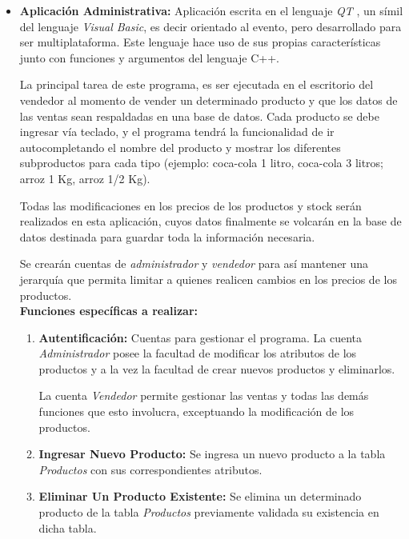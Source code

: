 \documentclass[a4paper,12pt]{article}
\begin{document}
  \begin{itemize}
   \item \textbf{Aplicación Administrativa:} 
    Aplicación escrita en el lenguaje \emph{QT} \cite{qtweb}, un símil del lenguaje
    \emph{Visual Basic}, es decir orientado al evento, pero desarrollado para ser multiplataforma. 
    Este lenguaje hace uso de sus propias características junto con funciones y argumentos del lenguaje C++.

    La principal tarea de este programa, es ser ejecutada en el escritorio del vendedor al momento de vender un
    determinado producto y que los datos de las ventas sean respaldadas en una base de datos. Cada producto se debe
    ingresar vía teclado, y el programa tendrá la funcionalidad de ir autocompletando el nombre del producto y mostrar
    los diferentes subproductos para cada tipo (ejemplo: coca-cola 1 litro, coca-cola 3 litros; arroz 1 Kg, arroz 1/2 Kg).

    Todas las modificaciones en los precios de los productos y stock serán realizados en esta aplicación, cuyos datos 
    finalmente se volcarán en la base de datos destinada para guardar toda la información necesaria.

    Se crearán cuentas de \emph{administrador} y \emph{vendedor} para así mantener una jerarquía que permita limitar
    a quienes realicen cambios en los precios de los productos. \\
    
    
    \textbf{Funciones específicas a realizar:}
      \begin{enumerate}
       \item \textbf{Autentificación: }Cuentas para gestionar el programa. La cuenta \emph{Administrador} posee la facultad de modificar los
			     atributos de los productos y a la vez la facultad de crear nuevos productos y eliminarlos.

                             La cuenta \emph{Vendedor} permite gestionar las ventas y todas las demás funciones que esto involucra, 
			     exceptuando la modificación de los productos.

       \newpage

       \item \textbf{Ingresar Nuevo Producto: }Se ingresa un nuevo producto a la tabla \emph{Productos} con sus correspondientes atributos.

       \item \textbf{Eliminar Un Producto Existente: }Se elimina un determinado producto de la tabla \emph{Productos} previamente validada su
                                                      existencia en dicha tabla.


\end{enumerate}
\end{itemize}
\end{document}
